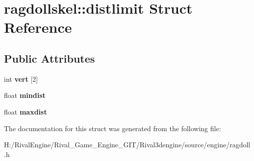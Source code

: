 \hypertarget{structragdollskel_1_1distlimit}{}\section{ragdollskel\+:\+:distlimit Struct Reference}
\label{structragdollskel_1_1distlimit}
\subsection*{Public Attributes}
\begin{DoxyCompactItemize}
\item 
\mbox{\label{structragdollskel_1_1distlimit_a4cd3810699031e22b95ca0fc888c6b1c}} 
int {\bfseries vert} \mbox{[}2\mbox{]}
\item 
\mbox{\label{structragdollskel_1_1distlimit_abe4b4411b9f79ec2b6bc8ff3acfe2c33}} 
float {\bfseries mindist}
\item 
\mbox{\label{structragdollskel_1_1distlimit_a0e41fa24956a9eb84c6ff75adced2580}} 
float {\bfseries maxdist}
\end{DoxyCompactItemize}


The documentation for this struct was generated from the following file\+:\begin{DoxyCompactItemize}
\item 
H\+:/\+Rival\+Engine/\+Rival\+\_\+\+Game\+\_\+\+Engine\+\_\+\+G\+I\+T/\+Rival3dengine/source/engine/ragdoll.\+h\end{DoxyCompactItemize}
